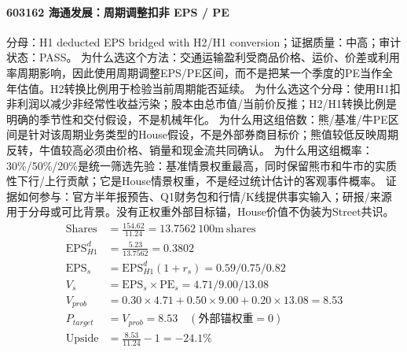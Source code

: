 \paragraph{603162 海通发展：周期调整扣非 EPS / PE}
分母：H1 deducted EPS bridged with H2/H1 conversion；证据质量：中高；审计状态：PASS。
为什么选这个方法：交通运输盈利受商品价格、运价、价差或利用率周期影响，因此使用周期调整EPS/PE区间，而不是把某一个季度的PE当作全年估值。H2转换比例用于检验当前周期能否延续。
为什么选这个分母：使用H1扣非利润以减少非经常性收益污染；股本由总市值/当前价反推；H2/H1转换比例是明确的季节性和交付假设，不是机械年化。
为什么用这组倍数：熊/基准/牛PE区间是针对该周期业务类型的House假设，不是外部券商目标价；熊值较低反映周期反转，牛值较高必须由价格、销量和现金流共同确认。
为什么用这组概率：30\%/50\%/20\%是统一筛选先验：基准情景权重最高，同时保留熊市和牛市的实质性下行/上行贡献；它是House情景权重，不是经过统计估计的客观事件概率。
证据如何参与：官方半年报预告、Q1财务包和行情/K线提供事实输入；研报/来源用于分母或可比背景。没有正权重外部目标锚，House价值不伪装为Street共识。
\begin{align*}
\mathrm{Shares} &= \frac{154.62}{11.24}=13.7562\ \mathrm{100m\ shares}\\
\mathrm{EPS}_{H1}^d &= \frac{5.23}{13.7562}=0.3802\\
\mathrm{EPS}_s &= \mathrm{EPS}_{H1}^d(1+r_s)=0.59/0.75/0.82\\
V_s &= \mathrm{EPS}_s\times \mathrm{PE}_s=4.71/9.00/13.08\\
V_{prob} &= 0.30\times 4.71+0.50\times 9.00+0.20\times 13.08=8.53\\
P_{target} &= V_{prob}=8.53\quad(\text{外部锚权重}=0)\\
\mathrm{Upside} &= \frac{8.53}{11.24}-1=-24.1\%\\
\end{align*}

